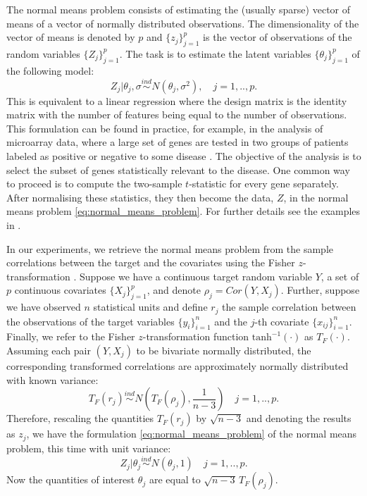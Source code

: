 \documentclass[american,]{article}
\theoremstyle{definition}
\begin{document}
The normal means problem consists of estimating the (usually
sparse) vector of means of a vector of normally distributed
observations. The dimensionality of the vector of means is denoted by
$p$ and $\{z_{j}\}_{j=1}^{p}$ is the vector of observations of the
random variables $\{Z_{j}\}_{j=1}^{p}$. The task is to estimate the
latent variables $\{\theta_{j}\}_{j=1}^{p}$ of the following model: \
\begin{equation}\label{eq:normal_means_problem}
Z_{j}|\theta_{j},\sigma\overset{ind}{\sim}N(\theta_{j},\sigma^{2}), \quad j=1,..,p.
\end{equation}
This is equivalent to a linear regression where the design matrix is
the identity matrix with the number of features being equal to the
number of observations. This formulation can be found in practice, for
example, in the analysis of microarray data, where a large set of
genes are tested in two groups of patients labeled as positive or
negative to some disease \citep{paper:efron,efron2012large}. The
objective of the analysis is to select the subset of genes
statistically relevant to the disease. One common way to proceed is to
compute the two-sample $t$-statistic for every gene separately.  After
normalising these statistics, they then become the data, $Z$, in the
normal means problem \eqref{eq:normal_means_problem}. For further
details see the examples in \cite{paper:efron, efron2012large}.

In our experiments, we retrieve the normal means problem from the
sample correlations between the target and the covariates using the
Fisher $z$-transformation \citep{hawkins1989using}. Suppose we have a
continuous target random variable $Y$, a set of $p$ continuous
covariates $\{X_{j}\}_{j=1}^{p}$, and denote
$\rho_{j}=Cor(Y,X_{j})$. Further, suppose we have observed $n$
statistical units and define $r_{j}$ the sample correlation between
the observations of the target variables $\{y_{i}\}_{i=1}^{n}$ and the
$j$-th covariate $\{x_{ij}\}_{i=1}^{n}$. Finally, we refer to the
Fisher $z$-transformation function $\text{tanh}^{-1}(\cdot)$ as
$T_{F}(\cdot)$. Assuming each pair $(Y,X_{j})$ to be bivariate
normally distributed, the corresponding transformed correlations are
approximately normally distributed with known variance: \
\begin{equation} \label{eq:fisher_transformation}
T_{F}(r_{j})\overset{ind}{\sim} N(T_{F}(\rho_{j}),\frac{1}{n-3}) \quad j=1,..,p.
\end{equation}
Therefore, rescaling the quantities $T_{F}(r_{j})$ by $\sqrt{n-3}$ and
denoting the results as $z_{j}$, we have the formulation
\eqref{eq:normal_means_problem} of the normal means problem, this time
with unit variance: \
\begin{equation} \label{eq:normal_means_problem2}
Z_{j}|\theta_{j}\overset{ind}{\sim}N(\theta_{j},1) \quad j=1,..,p.
\end{equation}
Now the quantities of interest $\theta_{j}$ are equal to
$\sqrt{n-3}\,T_{F}(\rho_{j})$.
\end{document}
